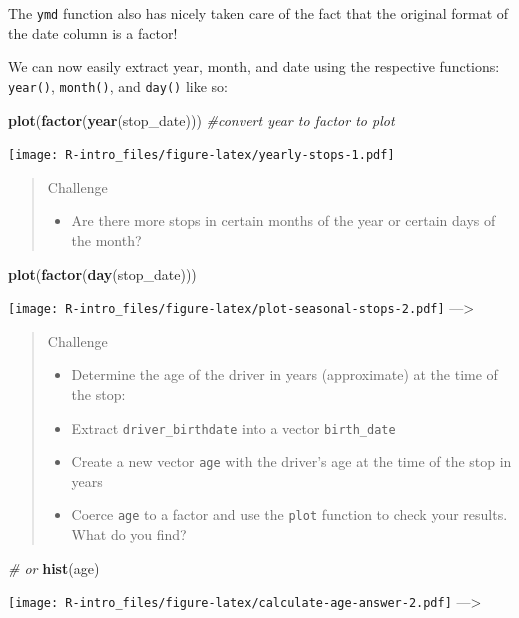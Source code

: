 \documentclass[]{book}
\newenvironment{Shaded}{\begin{snugshade}}{\end{snugshade}}
\newcommand{\KeywordTok}[1]{\textcolor[rgb]{0.13,0.29,0.53}{\textbf{#1}}}
\newcommand{\StringTok}[1]{\textcolor[rgb]{0.31,0.60,0.02}{#1}}
\newcommand{\CommentTok}[1]{\textcolor[rgb]{0.56,0.35,0.01}{\textit{#1}}}
\newcommand{\OperatorTok}[1]{\textcolor[rgb]{0.81,0.36,0.00}{\textbf{#1}}}
\newcommand{\NormalTok}[1]{#1}
\providecommand{\tightlist}{%
  \setlength{\itemsep}{0pt}\setlength{\parskip}{0pt}}
\begin{document}
\begin{Shaded}
\end{Shaded}

The \texttt{ymd} function also has nicely taken care of the fact that
the original format of the date column is a factor!

We can now easily extract year, month, and date using the respective
functions: \texttt{year()}, \texttt{month()}, and \texttt{day()} like
so:

\begin{Shaded}
\begin{Highlighting}[]
\KeywordTok{plot}\NormalTok{(}\KeywordTok{factor}\NormalTok{(}\KeywordTok{year}\NormalTok{(stop_date))) }\CommentTok{#convert year to factor to plot}
\end{Highlighting}
\end{Shaded}

\texttt{[image: R-intro\_files/figure-latex/yearly-stops-1.pdf]}

\begin{quote}
Challenge

\begin{itemize}
\tightlist
\item
  Are there more stops in certain months of the year or certain days of
  the month?
\end{itemize}
\end{quote}

\begin{Shaded}
\begin{Highlighting}[]
\KeywordTok{plot}\NormalTok{(}\KeywordTok{factor}\NormalTok{(}\KeywordTok{day}\NormalTok{(stop_date)))}
\end{Highlighting}
\end{Shaded}

\texttt{[image: R-intro\_files/figure-latex/plot-seasonal-stops-2.pdf]}
---\textgreater{}

\begin{quote}
Challenge

\begin{itemize}
\tightlist
\item
  Determine the age of the driver in years (approximate) at the time of
  the stop:
\item
  Extract \texttt{driver\_birthdate} into a vector \texttt{birth\_date}
\item
  Create a new vector \texttt{age} with the driver's age at the time of
  the stop in years
\item
  Coerce \texttt{age} to a factor and use the \texttt{plot} function to
  check your results. What do you find?
\end{itemize}
\end{quote}

\begin{Shaded}
\begin{Highlighting}[]
\CommentTok{# or}
\KeywordTok{hist}\NormalTok{(age)}
\end{Highlighting}
\end{Shaded}

\texttt{[image: R-intro\_files/figure-latex/calculate-age-answer-2.pdf]}
---\textgreater{}


\end{document}
